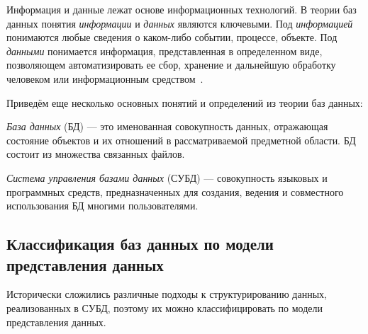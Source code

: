 Информация и данные лежат основе информационных технологий.
В теории баз данных понятия \textit{информации} и \textit{данных} являются ключевыми.
Под \textit{информацией} понимаются любые сведения о каком-либо событии, процессе, объекте.
Под \textit{данными} понимается информация, представленная в определенном виде,
позволяющем автоматизировать ее сбор, хранение и дальнейшую обработку человеком или
информационным средством~\cite{burakovVvedenie2010}.

Приведём еще несколько основных понятий и определений из теории баз данных:
\begin{compactitem}
      \item \textit{База данных} (БД) --- это именованная совокупность данных,
      отражающая состояние объектов и их отношений в рассматриваемой предметной области.
      БД состоит из множества связанных файлов.
      \item \textit{Система управления базами данных} (СУБД) --- совокупность языковых и программных средств,
      предназначенных для создания, ведения и совместного использования БД многими пользователями.
\end{compactitem}




\subsection{Классификация баз данных по модели представления данных}

Исторически сложились различные подходы к структурированию данных, реализованных в СУБД, поэтому их можно
классифицировать по модели представления данных.

